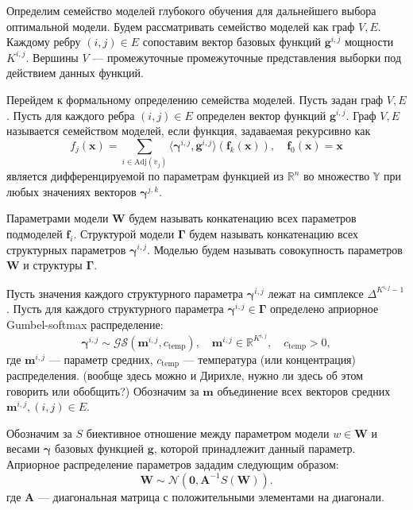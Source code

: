 \documentclass[12pt]{article}
\begin{document}
Определим семейство моделей глубокого обучения для дальнейшего выбора оптимальной модели. 
Будем рассматривать семейство моделей как граф $V,E$. Каждому ребру $(i,j) \in E$ сопоставим вектор базовых функций $\mathbf{g}^{i,j}$ мощности $K^{i,j}$. Вершины $V$ --- промежуточные промежуточные представления выборки под действием данных функций. 

Перейдем к формальному определению семейства моделей.
Пусть задан граф $V,E$. Пусть для каждого ребра $(i,j) \in E$ определен вектор функций $\mathbf{g}^{i,j}.$ Граф $V, E$ называется семейством моделей, если функция, задаваемая рекурсивно как 
\[
    f_j(\mathbf{x}) = \sum_{i \in \text{Adj}(v_j)} \langle \boldsymbol{\gamma}^{i,j}, \mathbf{g}^{i,j} \rangle \left(\mathbf{f}_k(\mathbf{x})\right), \quad \mathbf{f}_0(\mathbf{x}) = \mathbf{x}
\]
является дифференцируемой по параметрам функцией из $\mathbb{R}^n$ во множество $\mathbb{Y}$ при любых значениях векторов $\boldsymbol{\gamma}^{j,k}$.

Параметрами модели $\mathbf{W}$ будем называть конкатенацию всех параметров подмоделей $\mathbf{f}_i$.
Структурой модели $\boldsymbol{\Gamma}$ будем называть конкатенацию всех структурных параметров $\boldsymbol{\gamma}^{i,j}$.
Моделью будем называть совокупность параметров $\mathbf{W}$ и структуры $\boldsymbol{\Gamma}$.

Пусть значения каждого структурного параметра $\boldsymbol{\gamma}^{i,j}$ лежат на симплексе $\Delta^{K^{i,j}-1}$.
Пусть для каждого структурного параметра $\boldsymbol{\gamma}^{i,j} \in \boldsymbol{\Gamma}$ определено априорное Gumbel-softmax распределение:
\[
    \boldsymbol{\gamma}^{i,j} \sim \mathcal{GS}(\mathbf{m}^{i,j}, c_{\text{temp}}), \quad \mathbf{m}^{i,j} \in \mathbb{R}^{K^{i,j}}, \quad c_{\text{temp}} > 0,
\] 
где $\mathbf{m}^{i,j}$ --- параметр средних,  $c_{\text{temp}}$ --- температура (или концентрация) распределения. (вообще здесь можно и Дирихле, нужно ли здесь об этом говорить или обобщить?) Обозначим за $\mathbf{m}$ объединение всех векторов средних $\mathbf{m}^{i,j}, (i,j) \in E$.

 Обозначим за $S$ биективное отношение между параметром модели $w \in \mathbf{W}$ и весами $\boldsymbol{\gamma}$ базовых функцией $\mathbf{g}$, которой принадлежит данный параметр. 
Априорное распределение параметров  зададим следующим образом:
\[
    \mathbf{W} \sim \mathcal{N}\left(\mathbf{0}, \mathbf{A}^{-1} S(\mathbf{W})\right).
\]
где $\mathbf{A}$ --- диагональная матрица с положительными элементами на диагонали.
\end{document}

